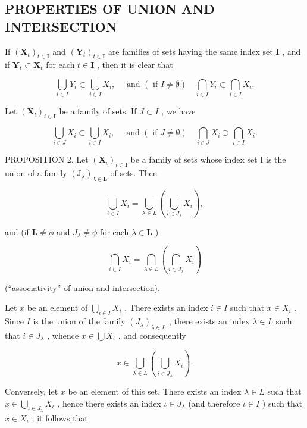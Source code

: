 \subsection{PROPERTIES OF UNION AND INTERSECTION}

If \((\mathbf{X}_t)_{t\in \mathbf{I}}\) and \((\mathbf{Y}_t)_{t\in \mathbf{I}}\) are families of sets having the same index set \(\mathbf{I}\) , and if \(\mathbf{Y}_t\subset \mathbf{X}_t\) for each \(t\in \mathbf{I}\) , then it is clear that

\[
\bigcup_ {i \in I} Y _ {i} \subset \bigcup_ {i \in I} X _ {i}, \quad \text { and } (\text { if   } I \neq \emptyset) \quad \bigcap_ {i \in I} Y _ {i} \subset \bigcap_ {i \in I} X _ {i}.
\]

Let \((\mathbf{X}_t)_{t\in \mathbf{I}}\) be a family of sets. If \(J\subset I\) , we have

\[
\bigcup_ {i \in J} X _ {i} \subset \bigcup_ {i \in I} X _ {i}, \quad \text { and } (\text { if } J \neq \emptyset) \quad \bigcap_ {i \in J} X _ {i} \supset \bigcap_ {i \in I} X _ {i}.
\]

PROPOSITION 2. Let \((\mathbf{X}_{\iota})_{\iota \in \mathbf{I}}\) be a family of sets whose index set I is the union of a family \((\mathrm{J}_{\lambda})_{\lambda \in \mathbf{L}}\) of sets. Then

\[
\bigcup_ {i \in I} X _ {i} = \bigcup_ {\lambda \in L} \left(\bigcup_ {i \in J _ {\lambda}} X _ {i}\right),
\]

and (if \(\mathbf{L} \neq \phi\) and \(J_{\lambda} \neq \phi\) for each \(\lambda \in \mathbf{L}\) )

\[
\bigcap_ {i \in I} X _ {i} = \bigcap_ {\lambda \in L} \left(\bigcap_ {i \in J _ {\lambda}} X _ {i}\right)
\]

(``associativity'' of union and intersection).

Let \(x\) be an element of \(\bigcup_{i \in I} X_i\) . There exists an index \(i \in I\) such that \(x \in X_i\) . Since \(I\) is the union of the family \((J_\lambda)_{\lambda \in L}\) , there exists an index \(\lambda \in L\) such that \(i \in J_\lambda\) , whence \(x \in \bigcup X_i\) , and consequently

\[
x \in \bigcup_ {\lambda \in L} \left(\bigcup_ {i \in J _ {\lambda}} X _ {i}\right).
\]

Conversely, let \(x\) be an element of this set. There exists an index \(\lambda \in L\) such that \(x \in \bigcup_{\iota \in J_{\lambda}} X_{\iota}\) , hence there exists an index \(\iota \in J_{\lambda}\) (and therefore \(\iota \in I\) ) such that \(x \in X_{\iota}\) ; it follows that

